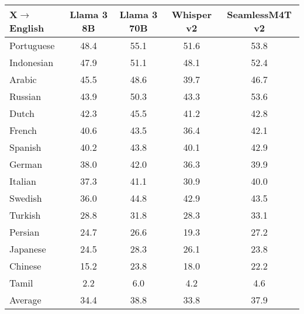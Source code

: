 \begin{NiceTabular}{lcccc}
	\CodeBefore
	\Body
	\toprule
	X$\rightarrow$English & Llama 3 8B & Llama 3 70B & Whisper v2 & SeamlessM4T v2 \\
	\midrule
	Portuguese	&	48.4	&	55.1	&	51.6	&	53.8	\\
	Indonesian	&	47.9	&	51.1	&	48.1	&	52.4	\\
	Arabic	&	45.5	&	48.6	&	39.7	&	46.7	\\
	Russian	&	43.9	&	50.3	&	43.3	&	53.6	\\
	Dutch	&	42.3	&	45.5	&	41.2	&	42.8	\\
	French	&	40.6	&	43.5	&	36.4	&	42.1	\\
	Spanish	&	40.2	&	43.8	&	40.1	&	42.9	\\
	German	&	38.0	&	42.0	&	36.3	&	39.9	\\
	Italian	&	37.3	&	41.1	&	30.9	&	40.0	\\
	Swedish	&	36.0	&	44.8	&	42.9	&	43.5	\\
	Turkish	&	28.8	&	31.8	&	28.3	&	33.1	\\
	Persian	&	24.7	&	26.6	&	19.3	&	27.2	\\
	Japanese	&	24.5	&	28.3	&	26.1	&	23.8	\\
	Chinese	&	15.2	&	23.8	&	18.0	&	22.2	\\
	Tamil	&	2.2	&	6.0	&	4.2	&	4.6	\\
	\midrule
	Average & 34.4& 38.8 & 33.8 & 37.9 \\
	\bottomrule
\end{NiceTabular}
